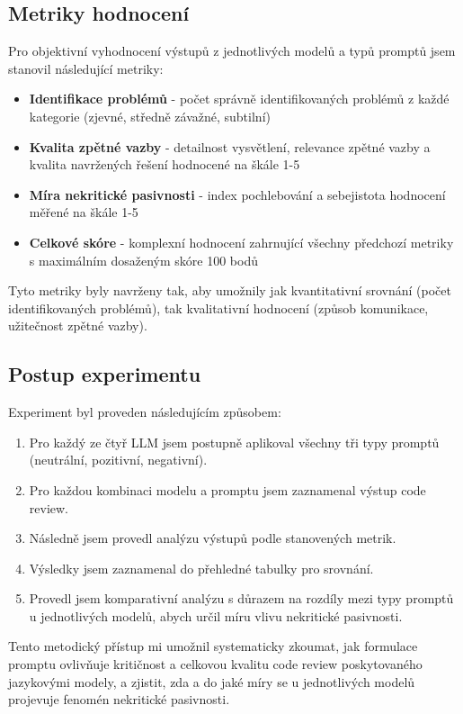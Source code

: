 \documentclass[12pt, a4paper]{article}
\begin{document}
\subsection{Metriky hodnocení}
Pro objektivní vyhodnocení výstupů z jednotlivých modelů a typů promptů jsem stanovil následující metriky:

\begin{itemize}
  \item \textbf{Identifikace problémů} - počet správně identifikovaných problémů z každé kategorie (zjevné, středně závažné, subtilní)
  \item \textbf{Kvalita zpětné vazby} - detailnost vysvětlení, relevance zpětné vazby a kvalita navržených řešení hodnocené na škále 1-5
  \item \textbf{Míra nekritické pasivnosti} - index pochlebování a sebejistota hodnocení měřené na škále 1-5
  \item \textbf{Celkové skóre} - komplexní hodnocení zahrnující všechny předchozí metriky s maximálním dosaženým skóre 100 bodů
\end{itemize}

Tyto metriky byly navrženy tak, aby umožnily jak kvantitativní srovnání (počet identifikovaných problémů), tak kvalitativní hodnocení (způsob komunikace, užitečnost zpětné vazby).

\subsection{Postup experimentu}
Experiment byl proveden následujícím způsobem:

\begin{enumerate}
  \item Pro každý ze čtyř LLM jsem postupně aplikoval všechny tři typy promptů (neutrální, pozitivní, negativní).
  \item Pro každou kombinaci modelu a promptu jsem zaznamenal výstup code review.
  \item Následně jsem provedl analýzu výstupů podle stanovených metrik.
  \item Výsledky jsem zaznamenal do přehledné tabulky pro srovnání.
  \item Provedl jsem komparativní analýzu s důrazem na rozdíly mezi typy promptů u jednotlivých modelů, abych určil míru vlivu nekritické pasivnosti.
\end{enumerate}

Tento metodický přístup mi umožnil systematicky zkoumat, jak formulace promptu ovlivňuje kritičnost a celkovou kvalitu code review poskytovaného jazykovými modely, a zjistit, zda a do jaké míry se u jednotlivých modelů projevuje fenomén nekritické pasivnosti.
\end{document}
